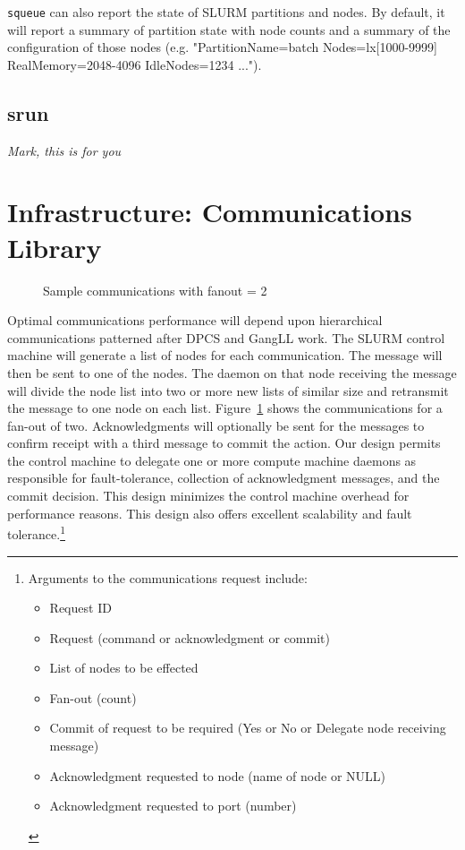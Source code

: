 {\tt squeue} can also report the state of SLURM partitions and nodes. 
By default, it will report a summary of partition state with node 
counts and a summary of the configuration of those nodes (e.g. 
"PartitionName=batch Nodes=lx[1000-9999] RealMemory=2048-4096 IdleNodes=1234 ...").

\subsection{srun}

{\em Mark, this is for you}

\section{Infrastructure: Communications Library}

\begin{figure}[htb]
\centerline{}
\caption{Sample communications with fanout = 2}
\label{communicate}
\end{figure}
Optimal communications performance will depend upon hierarchical communications
patterned after DPCS and GangLL work. The SLURM control machine will generate a
list of nodes for each communication. The message will then be sent to one of
the nodes. 
The daemon on that node receiving the message will divide the node list into
two or more new lists of similar size and retransmit the message to one node on
each list. Figure~\ref{communicate} shows the communications for a fan-out of 
two.  Acknowledgments will optionally be sent for the messages to confirm 
receipt with a third message to commit the action. Our design permits the 
control machine to delegate one or more compute machine daemons as responsible 
for fault-tolerance, collection of acknowledgment messages, and the commit
decision. This design minimizes the control machine overhead for performance
reasons. This design also offers excellent scalability and fault 
tolerance.\footnote{Arguments to the communications request include:
\begin{itemize}
\item Request ID
\item Request (command or acknowledgment or commit)
\item List of nodes to be effected
\item Fan-out (count)
\item Commit of request to be required (Yes or No or Delegate node receiving
      message) 
\item Acknowledgment requested to node (name of node or NULL)
\item Acknowledgment requested to port (number)
\end{itemize} }

